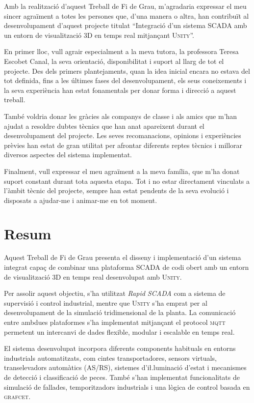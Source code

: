 \documentclass[a4paper,11pt,DIV=13,headings=normal,abstract=true,twoside=semi]{article}
\newcommand{\acro}[1]{\textsc{#1}}
\begin{document}
Amb la realització d'aquest Treball de Fi de Grau, m'agradaria expressar el meu sincer agraïment a totes les persones que, d'una manera o altra, han contribuït al desenvolupament d'aquest projecte titulat “Integració d'un sistema \acro{SCADA} amb un entorn de visualització 3D en temps real mitjançant \acro{Unity}”.

En primer lloc, vull agrair especialment a la meva tutora, la professora Teresa Escobet Canal, la seva orientació, disponibilitat i suport al llarg de tot el projecte. Des dels primers plantejaments, quan la idea inicial encara no estava del tot definida, fins a les últimes fases del desenvolupament, els seus coneixements i la seva experiència han estat fonamentals per donar forma i direcció a aquest treball.

També voldria donar les gràcies als companys de classe i als amics que m'han ajudat a resoldre dubtes tècnics que han anat apareixent durant el desenvolupament del projecte. Les seves recomanacions, opinions i experiències prèvies han estat de gran utilitat per afrontar diferents reptes tècnics i millorar diversos aspectes del sistema implementat.

Finalment, vull expressar el meu agraïment a la meva família, que m'ha donat suport constant durant tota aquesta etapa. Tot i no estar directament vinculats a l'àmbit tècnic del projecte, sempre han estat pendents de la seva evolució i disposats a ajudar-me i animar-me en tot moment.
\newpage
\section*{Resum}

Aquest Treball de Fi de Grau presenta el disseny i implementació d'un sistema integrat capaç de combinar una plataforma \acro{SCADA} de codi obert amb un entorn de visualització 3D en temps real desenvolupat amb \acro{Unity}. 

Per assolir aquest objectiu, s'ha utilitzat \emph{Rapid SCADA} com a sistema de supervisió i control industrial, mentre que \acro{Unity} s'ha emprat per al desenvolupament de la simulació tridimensional de la planta. La comunicació entre ambdues plataformes s'ha implementat mitjançant el protocol \acro{mqtt}  permetent un intercanvi de dades flexible, modular i escalable en temps real.

El sistema desenvolupat incorpora diferents components habituals en entorns industrials automatitzats, com cintes transportadores, sensors virtuals, transelevadors automàtics (\acro{AS/RS}), sistemes d'i\l.luminació d'estat i mecanismes de detecció i classificació de peces. També s'han implementat funcionalitats de simulació de fallades, temporitzadors industrials i una lògica de control basada en \acro{grafcet}.
\end{document}

